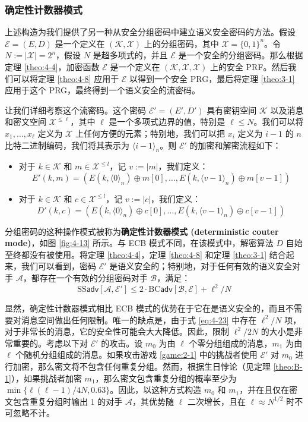 \subsubsection{确定性计数器模式}

上述构造为我们提供了另一种从安全分组密码中建立语义安全密码的方法。假设 $\mathcal{E}=(E,D)$ 是一个定义在 $(\mathcal{K},\mathcal{X})$ 上的分组密码，其中 $\mathcal{X}=\{0,1\}^n$。令 $N:=|\mathcal{X}|=2^n$，假设 $N$ 是超多项式的，并且 $\mathcal{E}$ 是一个安全的分组密码。那么根据定理 \ref{theo:4-4}，加密函数 $\mathcal{E}$ 是一个定义在 $(\mathcal{K},\mathcal{X},\mathcal{X})$ 上的安全 PRF。然后我们可以将定理 \ref{theo:4-8} 应用于 $\mathcal{E}$  以得到一个安全 PRG，最后将定理 \ref{theo:3-1} 应用于这个 PRG，最终得到一个语义安全的流密码。

让我们详细考察这个流密码。这个密码 $\mathcal{E}'=(E',D')$ 具有密钥空间 $\mathcal{K}$ 以及消息和密文空间 $\mathcal{X}^{\leq\ell}$，其中 $\ell$ 是一个多项式边界的值，特别是 $\ell\leq N$。我们可以将 $x_1,\dots,x_\ell$ 定义为 $\mathcal{X}$ 上任何方便的元素；特别地，我们可以把 $x_i$ 定义为 $i-1$ 的 $n$ 比特二进制编码，我们将其表示为 $\langle i-1\rangle_n$。则 $\mathcal{E}'$ 的加密和解密流程如下：
\begin{itemize}
	\item 对于 $k\in\mathcal{K}$ 和 $m\in\mathcal{X}^{\leq l}$，记 $v:=|m|$，我们定义：
	\[
	E'(k,m)=(E(k,\langle0\rangle_n)\oplus m[0],\dots,E(k,\langle v-1\rangle_n)\oplus m[v-1])
	\]
	\item 对于 $k\in\mathcal{K}$ 和 $c\in\mathcal{X}^{\leq l}$，记 $v:=|c|$，我们定义：
	\[
	D'(k,c)=(E(k,\langle0\rangle_n)\oplus c[0],\dots,E(k,\langle v-1\rangle_n)\oplus c[v-1])
	\]
\end{itemize}

分组密码的这种操作模式被称为\textbf{确定性计数器模式 (deterministic couter mode)}，如图 \ref{fig:4-13} 所示。与 ECB 模式不同，在该模式中，解密算法 $D$ 自始至终都没有被使用。将定理 \ref{theo:4-4}，定理 \ref{theo:4-8} 和定理 \ref{theo:3-1} 结合起来，我们可以看到，密码 $\mathcal{E}'$ 是语义安全的；特别地，对于任何有效的语义安全对手 $\mathcal{A}$，都存在一个有效的分组密码对手 $\mathcal{B}$，满足：
\begin{equation}\label{eq:4-23}
\mathrm{SS}\mathsf{adv}[\mathcal{A},\mathcal{E}']
\leq2\cdot
\mathrm{BC}\mathsf{adv}[\mathcal{B},\mathcal{E}]
+{\ell^2}/{N}
\end{equation}

显然，确定性计数器模式相比 ECB 模式的优势在于它在是语义安全的，而且不需要对消息空间做出任何限制。唯一的缺点是，由于式 \ref{eq:4-23} 中存在 ${\ell^2}/{N}$ 项，对于非常长的消息，它的安全性可能会大大降低。因此，限制 ${\ell^2}/{2N}$ 的大小是非常重要的。考虑以下对 $\mathcal{E}'$ 的攻击。设 $m_0$ 为由 $\ell$ 个零分组组成的消息，$m_1$ 为由 $\ell$ 个随机分组组成的消息。如果攻击游戏 \ref{game:2-1} 中的挑战者使用 $\mathcal{E}'$ 对 $m_0$ 进行加密，那么密文将不包含任何重复分组。然而，根据生日悖论（见定理 \ref{theo:B-1}），如果挑战者加密 $m_1$，那么密文包含重复分组的概率至少为 $\min\{{\ell(\ell-1)}/{4N},0.63\}$。因此，以这种方式构造 $m_0$ 和 $m_1$，并在且仅在密文包含重复分组时输出 $1$ 的对手 $\mathcal{A}$，其优势随 $\ell$ 二次增长，且在 $\ell\approx N^{1/2}$ 时不可忽略不计。

